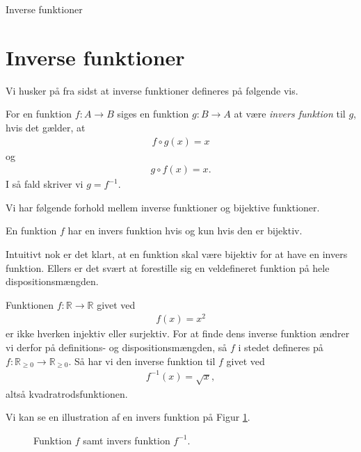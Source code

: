 \begin{center}
\Huge
	Inverse funktioner 
\end{center}
\section*{Inverse funktioner}
Vi husker på fra sidst at inverse funktioner defineres på følgende vis. 
\begin{defn}
	For en funktion $f:A\to B$ siges en funktion $g:B\to A$ at være \textit{invers funktion} til $g$, hvis det gælder, 
	at 
	\begin{align*}
		f\circ g (x) = x
	\end{align*}
	og
	\begin{align*}
		g \circ f(x) = x.
	\end{align*}
	I så fald skriver vi $g = f^{-1}$.
\end{defn}

Vi har følgende forhold mellem inverse funktioner og bijektive funktioner.
\begin{setn}
	En funktion $f$ har en invers funktion hvis og kun hvis den er bijektiv. 
\end{setn}
Intuitivt nok er det klart, at en funktion skal være bijektiv for at have en invers funktion. Ellers er det svært at forestille sig en veldefineret funktion på hele dispositionsmængden.

\begin{exa}
	Funktionen $f:\mathbb{R} \to \mathbb{R}$ givet ved 
	\begin{align*}
		f(x) = x^2
	\end{align*}
	er ikke hverken injektiv eller surjektiv. For at finde dens inverse funktion ændrer vi derfor på
	definitions- og dispositionsmængden, så $f$ i stedet defineres på $f:\mathbb{R}_{\geq 0} \to 
	\mathbb{R}_{\geq 0}$. Så har vi den inverse funktion til $f$ givet ved
	\begin{align*}
		f^{-1}(x) = \sqrt{x},
	\end{align*}
	altså kvadratrodsfunktionen. 
\end{exa}

Vi kan se en illustration af en invers funktion på Figur \ref{fig:inv}. 
\begin{figure}[H]
	\centering
	\caption{Funktion $f$ samt invers funktion $f^{-1}$.}
	\label{fig:inv}
\end{figure}

